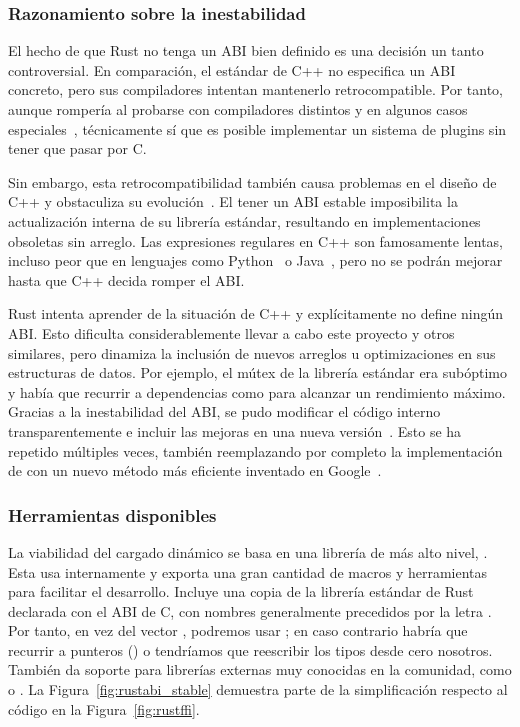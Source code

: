 \subsubsection{Razonamiento sobre la inestabilidad}

El hecho de que Rust no tenga un ABI bien definido es una decisión un tanto
controversial. En comparación, el estándar de C++ no especifica un ABI concreto,
pero sus compiladores intentan mantenerlo retrocompatible. Por tanto, aunque
rompería al probarse con compiladores distintos y en algunos casos
especiales~\cite{cpp_abi_problems}, técnicamente sí que es posible implementar
un sistema de plugins sin tener que pasar por C.

Sin embargo, esta retrocompatibilidad también causa problemas en el diseño de
C++ y obstaculiza su evolución~\cite{cpp_dead_std}. El tener un ABI estable
imposibilita la actualización interna de su librería estándar, resultando en
implementaciones obsoletas sin arreglo. Las expresiones regulares en C++ son
famosamente lentas, incluso peor que en lenguajes como
Python~\cite{cpp_vs_python_regex1}\cite{cpp_vs_python_regex2} o
Java~\cite{cpp_vs_java_regex}, pero no se podrán mejorar hasta que C++ decida
romper el ABI.

Rust intenta aprender de la situación de C++ y explícitamente no define ningún
ABI. Esto dificulta considerablemente llevar a cabo este proyecto y otros
similares, pero dinamiza la inclusión de nuevos arreglos u optimizaciones en sus
estructuras de datos. Por ejemplo, el mútex de la librería estándar era
subóptimo y había que recurrir a dependencias como  para
alcanzar un rendimiento máximo. Gracias a la inestabilidad del ABI, se pudo
modificar el código interno transparentemente e incluir las mejoras en una nueva
versión~\cite{rust_replace_mutex}. Esto se ha repetido múltiples veces, también reemplazando por completo
la implementación de  con un nuevo método más eficiente inventado
en Google~\cite{rust_replace_map}\cite{hashbrown}.

\subsubsection{Herramientas disponibles}

La viabilidad del cargado dinámico se basa en una librería de más alto nivel,
. Esta usa  internamente y exporta una
gran cantidad de macros y herramientas para facilitar el desarrollo. Incluye una
copia de la librería estándar de Rust declarada con el ABI de C, con nombres
generalmente precedidos por la letra . Por tanto, en vez del vector
, podremos usar ; en caso contrario habría que
recurrir a punteros () o tendríamos que reescribir los tipos
desde cero nosotros. También da soporte para librerías externas muy conocidas en
la comunidad, como  o . La
Figura~\ref{fig:rustabi_stable} demuestra parte de la simplificación respecto al
código en la Figura~\ref{fig:rustffi}.

